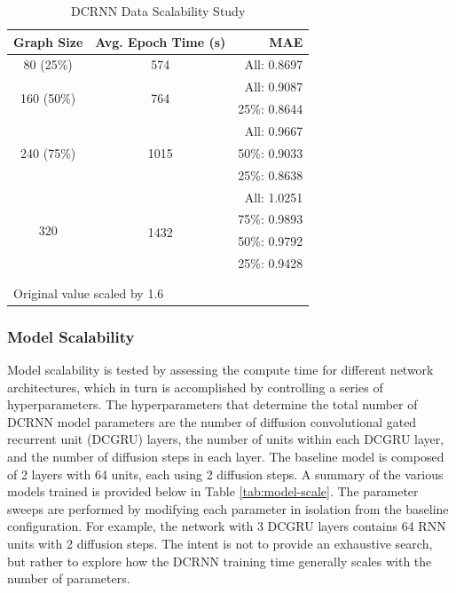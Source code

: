 \documentclass{article}
\begin{document}
\begin{table}[hbt!]
	\caption{DCRNN Data Scalability Study}
	\centering
	\begin{tabular}{ccr}
		\toprule
		Graph Size                  & Avg. Epoch Time (s)   & MAE \\
		\midrule
		80 (25\%)                   & 574                   & All: 0.8697 \\
		\midrule
		\multirow{2}{*}{160 (50\%)} & \multirow{2}{*}{764}  & All: 0.9087 \\ & & 25\%: 0.8644 \\
		\midrule
		\multirow{3}{*}{240 (75\%)} & \multirow{3}{*}{1015} & All: 0.9667 \\ & & 50\%: 0.9033 \\ & & 25\%: 0.8638 \\
		\midrule
		\multirow{4}{*}{320}        & \multirow{4}{*}{1432\textsuperscript{\textasteriskcentered}}    & All: 1.0251 \\ & & 75\%: 0.9893 \\ & & 50\%: 0.9792 \\ & & 25\%: 0.9428 \\
		\bottomrule \\
		\multicolumn{2}{l}{\textsuperscript{\textasteriskcentered}Original value scaled by 1.6}
	\end{tabular}
	\label{tab:data-scale}
\end{table}

\subsubsection{Model Scalability}

Model scalability is tested by assessing the compute time for different network architectures, which in turn is accomplished by controlling a series of hyperparameters. The hyperparameters that determine the total number of DCRNN model parameters are the number of diffusion convolutional gated recurrent unit (DCGRU) layers, the number of units within each DCGRU layer, and the number of diffusion steps in each layer. The baseline model is composed of 2 layers with 64 units, each using 2 diffusion steps. A summary of the various models trained is provided below in Table \ref{tab:model-scale}. The parameter sweeps are performed by modifying each parameter in isolation from the baseline configuration. For example, the network with 3 DCGRU layers contains 64 RNN units with 2 diffusion steps. The intent is not to provide an exhaustive search, but rather to explore how the DCRNN training time generally scales with the number of parameters.
\end{document}
